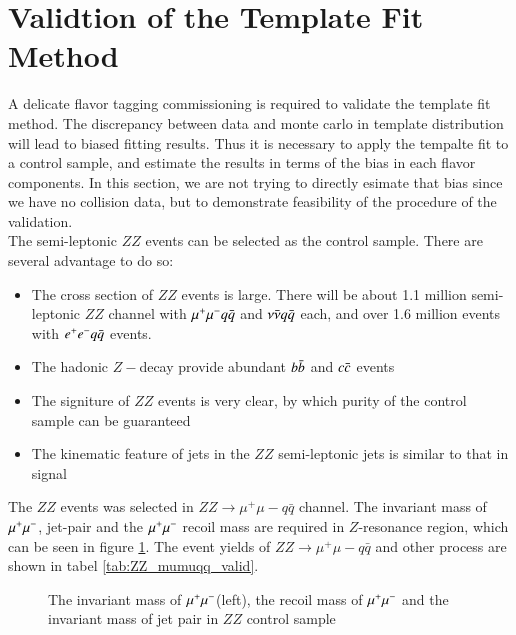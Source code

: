 \section{Validtion of the Template Fit Method}
A delicate flavor tagging commissioning is required to validate the template fit method. The discrepancy between data and monte carlo in template distribution will lead to biased fitting results. 
Thus it is necessary to apply the tempalte fit to a control sample, and estimate the results in terms of the bias in each flavor components. 
In this section, we are not trying to directly esimate that bias since we have no collision data, but to demonstrate  feasibility of the procedure of the validation. \\
The semi-leptonic $ZZ$ events can be selected as the control sample. There are several advantage to do so:
\begin{itemize}
\item The cross section of $ZZ$ events is large. There will be about 1.1 million semi-leptonic $ZZ$ channel with $\mu^{+}\mu^{-}q\bar{q}$ and $\nu\bar{\nu}q\bar{q}$ each, and over 1.6 million events with $e^{+}e^{-}q\bar{q}$ events.
\item The hadonic $Z-$decay provide abundant $b\bar{b}$ and $c\bar{c}$ events
\item The signiture of $ZZ$ events is very clear, by which purity of the control sample can be guaranteed 
\item The kinematic feature of jets in the $ZZ$ semi-leptonic jets is similar to that in signal 
\end{itemize}
The $ZZ$ events was selected in $ZZ\to\mu^{+}\mu{-}q\bar{q}$ channel. The invariant mass of $\mu^{+}\mu^{-}$, jet-pair and the $\mu^{+}\mu^{-}$ recoil mass are required in $Z$-resonance region, which can be seen in figure \ref{fig:ZZ_mumuqq_valid}. The event yields of $ZZ\to\mu^{+}\mu{-}q\bar{q}$ and other process are shown in tabel \ref{tab:ZZ_mumuqq_valid}.
\begin{figure}[!htpb]
\label{fig:ZZ_mumuqq_valid}
\centering
{}
\caption{The invariant mass of $\mu^{+}\mu^{-}$(left), the recoil mass of $\mu^{+}\mu^{-}$ and the invariant mass of jet pair in $ZZ$ control sample}
\end{figure}

